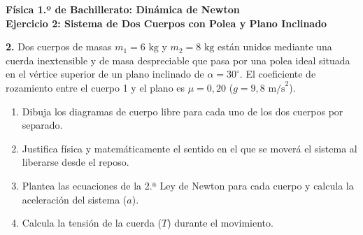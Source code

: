 ﻿\documentclass[11pt,a4paper]{article}
\begin{document}
\newpage

\begin{center}
    {\LARGE \textbf{Física 1.º de Bachillerato: Dinámica de Newton}}\\[4pt]
    {\large \textbf{Ejercicio 2: Sistema de Dos Cuerpos con Polea y Plano Inclinado}}
\end{center}

\vspace{0.4cm}
\noindent\textbf{2.} Dos cuerpos de masas $m_1 = 6\text{ kg}$ y $m_2 = 8\text{ kg}$ están unidos mediante una cuerda inextensible y de masa despreciable que pasa por una polea ideal situada en el vértice superior de un plano inclinado de $\alpha = 30^\circ$. El coeficiente de rozamiento entre el cuerpo 1 y el plano es $\mu = 0{,}20$ ($g = 9{,}8\text{ m/s}^2$).

\begin{center}
\end{center}

\begin{enumerate}[label=\textbf{\alph*)}, leftmargin=2em, itemsep=8pt]
    \item Dibuja los diagramas de cuerpo libre para cada uno de los dos cuerpos por separado.
    \item Justifica física y matemáticamente el sentido en el que se moverá el sistema al liberarse desde el reposo.
    \item Plantea las ecuaciones de la 2.ª Ley de Newton para cada cuerpo y calcula la aceleración del sistema ($a$).
    \item Calcula la tensión de la cuerda ($T$) durante el movimiento.
\end{enumerate}
\end{document}
